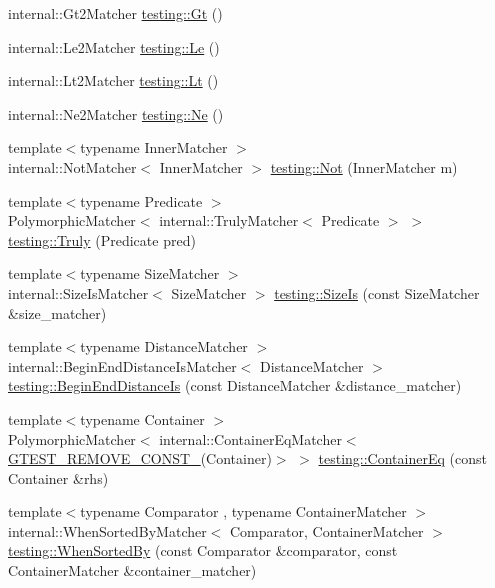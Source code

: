 \begin{DoxyCompactItemize}
internal\+::\+Gt2\+Matcher \hyperlink{namespacetesting_a3eaae6408f77ba7d87ca2d6a21dbde77}{testing\+::\+Gt} ()
\item 
internal\+::\+Le2\+Matcher \hyperlink{namespacetesting_a04def1c627ea7e3fce2f08cb06e83ebc}{testing\+::\+Le} ()
\item 
internal\+::\+Lt2\+Matcher \hyperlink{namespacetesting_a3b4d6d29d715c1bf219163f5206b53d4}{testing\+::\+Lt} ()
\item 
internal\+::\+Ne2\+Matcher \hyperlink{namespacetesting_a0cde8994764617eebc751e682c28d4ae}{testing\+::\+Ne} ()
\item 
{\footnotesize template$<$typename Inner\+Matcher $>$ }\\internal\+::\+Not\+Matcher$<$ Inner\+Matcher $>$ \hyperlink{namespacetesting_a3d7d0dda7e51b13fe2f5aa28e23ed6b6}{testing\+::\+Not} (Inner\+Matcher m)
\item 
{\footnotesize template$<$typename Predicate $>$ }\\Polymorphic\+Matcher$<$ internal\+::\+Truly\+Matcher$<$ Predicate $>$ $>$ \hyperlink{namespacetesting_a5faf05cfaae6074439960048e478b1c8}{testing\+::\+Truly} (Predicate pred)
\item 
{\footnotesize template$<$typename Size\+Matcher $>$ }\\internal\+::\+Size\+Is\+Matcher$<$ Size\+Matcher $>$ \hyperlink{namespacetesting_acd5e215558f95f1393c048a6d496060d}{testing\+::\+Size\+Is} (const Size\+Matcher \&size\+\_\+matcher)
\item 
{\footnotesize template$<$typename Distance\+Matcher $>$ }\\internal\+::\+Begin\+End\+Distance\+Is\+Matcher$<$ Distance\+Matcher $>$ \hyperlink{namespacetesting_a122739b5b6bd9f993f26800dafdb4cc3}{testing\+::\+Begin\+End\+Distance\+Is} (const Distance\+Matcher \&distance\+\_\+matcher)
\item 
{\footnotesize template$<$typename Container $>$ }\\Polymorphic\+Matcher$<$ internal\+::\+Container\+Eq\+Matcher$<$ \hyperlink{gtest-internal_8h_a2ffec8c60510eb130af387f5ce9a756a}{G\+T\+E\+S\+T\+\_\+\+R\+E\+M\+O\+V\+E\+\_\+\+C\+O\+N\+S\+T\+\_\+}(Container)$>$ $>$ \hyperlink{namespacetesting_a5928ffc4e976a4da981512c422792840}{testing\+::\+Container\+Eq} (const Container \&rhs)
\item 
{\footnotesize template$<$typename Comparator , typename Container\+Matcher $>$ }\\internal\+::\+When\+Sorted\+By\+Matcher$<$ Comparator, Container\+Matcher $>$ \hyperlink{namespacetesting_af74dfcde9ed88d79cf69dfda049078a3}{testing\+::\+When\+Sorted\+By} (const Comparator \&comparator, const Container\+Matcher \&container\+\_\+matcher)

\end{DoxyCompactItemize}

